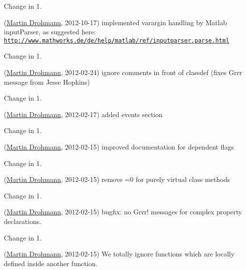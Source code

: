 \begin{DoxyRefDesc}{Change in 1.}
\item[\hyperlink{changelog1_4__changelog1_4000004}{Change in 1.\+4}](\hyperlink{developers_md}{Martin Drohmann}, 2012-\/10-\/17) implemented varargin handling by Matlab input\+Parser, as suggested here\+: \href{http://www.mathworks.de/de/help/matlab/ref/inputparser.parse.html}{\tt http\+://www.\+mathworks.\+de/de/help/matlab/ref/inputparser.\+parse.\+html}\end{DoxyRefDesc}


\begin{DoxyRefDesc}{Change in 1.}
\item[\hyperlink{changelog1_4__changelog1_4000005}{Change in 1.\+4}](\hyperlink{developers_md}{Martin Drohmann}, 2012-\/02-\/24) ignore comments in front of classdef (fixes Grrr message from Jesse Hopkins)\end{DoxyRefDesc}


\begin{DoxyRefDesc}{Change in 1.}
\item[\hyperlink{changelog1_3__changelog1_3000004}{Change in 1.\+3}](\hyperlink{developers_md}{Martin Drohmann}, 2012-\/02-\/17) added events section\end{DoxyRefDesc}


\begin{DoxyRefDesc}{Change in 1.}
\item[\hyperlink{changelog1_3__changelog1_3000005}{Change in 1.\+3}](\hyperlink{developers_md}{Martin Drohmann}, 2012-\/02-\/15) improved documentation for dependent flags\end{DoxyRefDesc}


\begin{DoxyRefDesc}{Change in 1.}
\item[\hyperlink{changelog1_3__changelog1_3000006}{Change in 1.\+3}](\hyperlink{developers_md}{Martin Drohmann}, 2012-\/02-\/15) remove =0 for purely virtual class methods\end{DoxyRefDesc}


\begin{DoxyRefDesc}{Change in 1.}
\item[\hyperlink{changelog1_3__changelog1_3000007}{Change in 1.\+3}](\hyperlink{developers_md}{Martin Drohmann}, 2012-\/02-\/15) bugfix\+: no Grrr! messages for complex property declarations.\end{DoxyRefDesc}


\begin{DoxyRefDesc}{Change in 1.}
\item[\hyperlink{changelog1_3__changelog1_3000008}{Change in 1.\+3}](\hyperlink{developers_md}{Martin Drohmann}, 2012-\/02-\/15) We totally ignore functions which are locally defined inside another function.\end{DoxyRefDesc}


